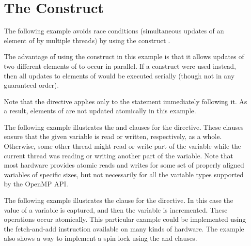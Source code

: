\pagebreak
\section{The  Construct}
\label{sec:atomic}

The following example avoids race conditions (simultaneous updates of an element 
of  by multiple threads) by using the  construct .

The advantage of using the  construct in this example is that it 
allows updates of two different elements of  to occur in parallel. If 
a  construct were used instead, then all updates to elements of 
 would be executed serially (though not in any guaranteed order).

Note that the  directive applies only to the statement immediately 
following it. As a result, elements of  are not updated atomically in 
this example.



The following example illustrates the  and   clauses 
for the  directive. These clauses ensure that the given variable 
is read or written, respectively, as a whole. Otherwise, some other thread might 
read or write part of the variable while the current thread was reading or writing 
another part of the variable. Note that most hardware provides atomic reads and 
writes for some set of properly aligned variables of specific sizes, but not necessarily 
for all the variable types supported by the OpenMP API.



The following example illustrates the  clause for the  
directive. In this case the value of a variable is captured, and then the variable 
is incremented. These operations occur atomically. This particular example could 
be implemented using the fetch-and-add instruction available on many kinds of hardware. 
The example also shows a way to implement a spin lock using the  
 and  clauses.




